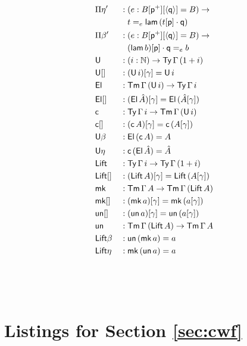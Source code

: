 \documentclass[submission,copyright,creativecommons]{eptcs}
\newcommand{\ra}{\rightarrow}
\newcommand{\Ty}{\mathsf{Ty}}
\newcommand{\Tm}{\mathsf{Tm}}
\newcommand{\p}{\mathsf{p}}
\newcommand{\q}{\mathsf{q}}
\newcommand{\N}{\mathbb{N}}
\newcommand{\lam}{\mathsf{lam}}
\newcommand{\U}{\mathsf{U}}
\newcommand{\El}{\mathsf{El}}
\newcommand{\cd}{\mathsf{c}}
\newcommand{\Lift}{\mathsf{Lift}}
\newcommand{\mk}{\mathsf{mk}}
\newcommand{\un}{\mathsf{un}}
\begin{document}
\begin{minipage}{0.4\textwidth}
\begin{alignat*}{10}
  & \Pi\eta' && : (e:B[\p^+][\langle\q\rangle] = B)\ra \\
  & && \hphantom{{}:{}} t =_e \lam\,(t[\p]\cdot\q) \\
  & \Pi\beta' && : (e:B[\p^+][\langle\q\rangle] = B)\ra \\
  & && \hphantom{{}:{}} (\lam\,b)[\p]\cdot\q =_e b \\
  & \U && : (i:\N)\ra\Ty\,\Gamma\,(1+i) \\
  & \U[] && : (\U\,i)[\gamma] = \U\,i \\  
  & \El && : \Tm\,\Gamma\,(\U\,i) \ra \Ty\,\Gamma\,i \\
  & \El[] && : (\El\,\hat{A})[\gamma] = \El\,(\hat{A}[\gamma]) \\
  & \cd && : \Ty\,\Gamma\,i\ra\Tm\,\Gamma\,(\U\,i) \\
  & \cd[] && : (\cd\,A)[\gamma] = \cd\,(A[\gamma]) \\
  & \U\beta && : \El\,(\cd\,A) = A \\
  & \U\eta && : \cd\,(\El\,\hat{A}) = \hat{A} \\
  & \Lift && : \Ty\,\Gamma\,i\ra\Ty\,\Gamma\,(1+i) \\
  & \Lift[] && : (\Lift\,A)[\gamma] = \Lift\,(A[\gamma]) \\
  & \mk && : \Tm\,\Gamma\,A \ra \Tm\,\Gamma\,(\Lift\,A) \\
  & \mk[] && : (\mk\,a)[\gamma] = \mk\,(a[\gamma]) \\
  & \un[] && : (\un\,a)[\gamma] = \un\,(a[\gamma]) \\
  & \un && : \Tm\,\Gamma\,(\Lift\,A) \ra \Tm\,\Gamma\,A \\
  & \Lift\beta && : \un\,(\mk\,a) = a \\
  & \Lift\eta && : \mk\,(\un\,a) = a \\
  & \\
  & \\
  & \\
\end{alignat*}
\end{minipage}

\newpage

\section{Listings for Section \ref{sec:cwf}}
\label{app:functor}
\end{document}

